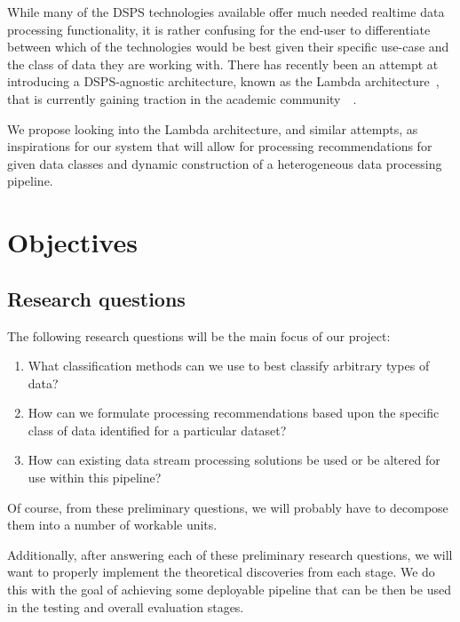 \documentclass[a4paper,11pt]{article}
\begin{document}
While many of the DSPS technologies available offer much needed realtime data processing functionality, it is rather
confusing for the end-user to differentiate between which of the technologies would be best given their specific
use-case and the class of data they are working with. There has recently been an attempt at introducing a DSPS-agnostic
architecture, known as the Lambda architecture~\cite{marz2013principles}, that is currently gaining traction in the
academic community~\cite{islam_cloud_2014}~\cite{liu_survey_2014}.

We propose looking into the Lambda architecture, and similar attempts, as inspirations for our system that will allow
for processing recommendations for given data classes and dynamic construction of a heterogeneous data processing
pipeline.





\section{Objectives} %
\label{sec:objectives}

\subsection{Research questions} %
\label{sub:research_questions}

The following research questions will be the main focus of our project:

\begin{enumerate}
  \item What classification methods can we use to best classify arbitrary types of data?
  \item How can we formulate processing recommendations based upon the specific class of data identified for a particular dataset?
  \item How can existing data stream processing solutions be used or be altered for use within this pipeline?
\end{enumerate}

Of course, from these preliminary questions, we will probably have to decompose them into a number of workable units.

Additionally, after answering each of these preliminary research questions, we will want to properly implement the
theoretical discoveries from each stage. We do this with the goal of achieving some deployable pipeline that can be then
be used in the testing and overall evaluation stages.
\end{document}
